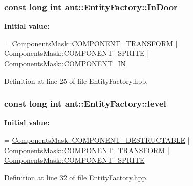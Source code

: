 \hypertarget{classant_1_1_entity_factory_ad1648971a3f0d3d1ecade497a8e9a54e}{
\subsubsection[{In\+Door}]{\setlength{\rightskip}{0pt plus 5cm}const long int ant\+::\+Entity\+Factory\+::\+In\+Door\hspace{0.3cm}{\ttfamily [static]}}}\label{classant_1_1_entity_factory_ad1648971a3f0d3d1ecade497a8e9a54e}
{\bfseries Initial value\+:}
\begin{DoxyCode}
= \hyperlink{class_components_mask_a3a66579e45c351c13abe63e61f2eaa0a}{ComponentsMask::COMPONENT\_TRANSFORM}
                                | \hyperlink{class_components_mask_ab05302f9381801724a58273ff83ad2a6}{ComponentsMask::COMPONENT\_SPRITE}
                                | \hyperlink{class_components_mask_a6a8d73981d65f39acb16bbeeced5a95b}{ComponentsMask::COMPONENT\_IN}
\end{DoxyCode}


Definition at line 25 of file Entity\+Factory.\+hpp.

\hypertarget{classant_1_1_entity_factory_a94033dca09c55b92cc187e64c375c352}{
\subsubsection[{level}]{\setlength{\rightskip}{0pt plus 5cm}const long int ant\+::\+Entity\+Factory\+::level\hspace{0.3cm}{\ttfamily [static]}}}\label{classant_1_1_entity_factory_a94033dca09c55b92cc187e64c375c352}
{\bfseries Initial value\+:}
\begin{DoxyCode}
= \hyperlink{class_components_mask_af9ec785367e18857389d34be89269879}{ComponentsMask::COMPONENT\_DESTRUCTABLE}
                                | \hyperlink{class_components_mask_a3a66579e45c351c13abe63e61f2eaa0a}{ComponentsMask::COMPONENT\_TRANSFORM}
                                | \hyperlink{class_components_mask_ab05302f9381801724a58273ff83ad2a6}{ComponentsMask::COMPONENT\_SPRITE}
\end{DoxyCode}


Definition at line 32 of file Entity\+Factory.\+hpp.

